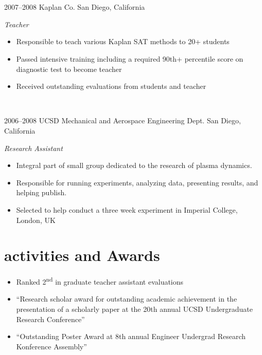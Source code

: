 \documentclass[]{friggeri-cv} %
\begin{document}
~\\
\begin{entrylist}
~\\
\entry
{2007--2008} 
{Kaplan Co.}
{San Diego, California}
{\emph{Teacher} 
\begin{itemize} 
\item Responsible to teach various Kaplan SAT methods to 20+ students
\item Passed intensive training including a required 90th+ percentile score on diagnostic test to become
teacher
\item Received outstanding evaluations from students and teacher
\end{itemize}
}

~\\
\end{entrylist}
\begin{entrylist}
\entry
{2006--2008}
{UCSD Mechanical and Aerospace Engineering Dept.}
{San Diego, California}
{\emph{Research Assistant} \\ 
\begin{itemize}
\item Integral part of small group dedicated to the research of plasma dynamics.
\item Responsible for running experiments, analyzing data, presenting results, and helping publish.
\item Selected to help conduct a three week experiment in Imperial College, London, UK
\end{itemize}}
\end{entrylist}


\section{activities and Awards}
\begin{itemize}
\item Ranked 2\textsuperscript{nd} in graduate teacher assistant evaluations   
\item ``Research scholar award for outstanding academic achievement in the presentation of a scholarly
paper at the 20th annual UCSD Undergraduate Research Conference''
\item ``Outstanding Poster Award at 8th annual Engineer Undergrad Research Konference Assembly''
\end{itemize}
\end{document}

